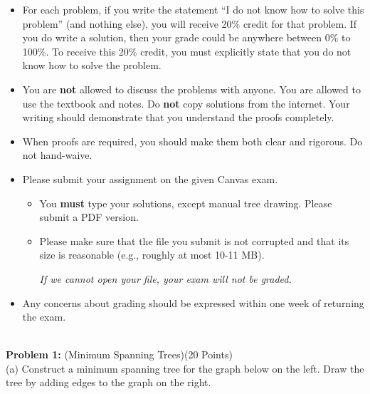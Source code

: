 \documentclass[11pt]{amsart}
\begin{document}
\begin{itemize}

\item %
For each problem, if you write  the statement ``I do not know how to solve this problem'' (and nothing else), you will receive 20\% credit for that problem. If you do write a solution, then your grade could be anywhere between 0\% to 100\%.
To receive this 20\% credit, you must explicitly state that you do not know how to solve the problem.

\item You are \textbf{not} allowed to discuss the problems with anyone. You are allowed to use the textbook and notes. Do \textbf{not} copy solutions from the internet. Your writing should demonstrate that you understand the proofs completely.

\item When proofs are required, you should make them both clear and rigorous. Do not hand-waive.

 \item Please submit your assignment on the given Canvas exam.
 \begin{itemize}
\item  You \textbf{must} type your solutions, except manual tree drawing. Please submit a PDF version.
\item Please make sure that the file you submit is not corrupted and that its size is reasonable (e.g., roughly at most 10-11 MB).
\begin{center}
\emph{If we cannot open your file, your exam will not be graded.}
\end{center}
\end{itemize}

\item Any concerns about grading should be expressed within one week of
returning the exam. 
 
\end{itemize}


\newpage
\hrulefill \\

\textbf{Problem 1:} (Minimum Spanning Trees)\hfill (20 Points)\\

(a) Construct a minimum spanning tree for the graph below on the left. Draw the tree by adding edges to the graph on the right.
\end{document}
